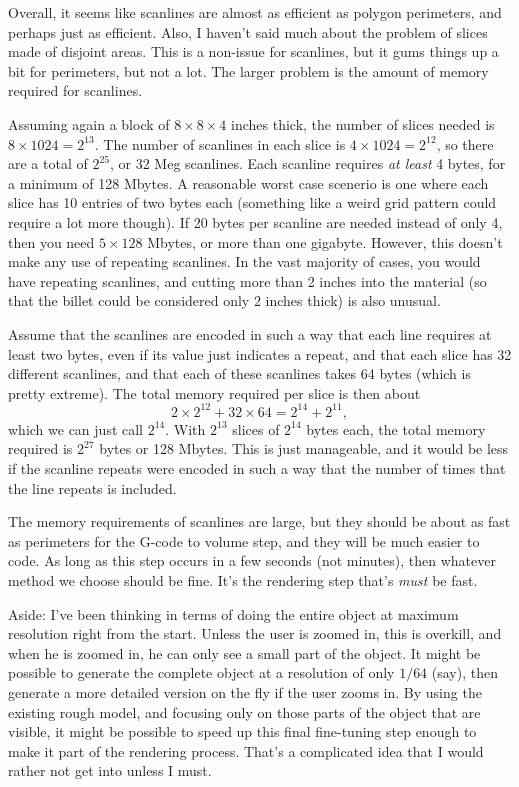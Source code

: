\documentclass[titlepage,oneside,10pt]{article}
\begin{document}
Overall, it seems like scanlines are almost as efficient as polygon
perimeters, and perhaps just as efficient. Also, I haven't said much
about the problem of slices made of disjoint areas. This is a
non-issue for scanlines, but it gums things up a bit for perimeters, but
not a lot. The larger problem is the amount of memory required for
scanlines. 

Assuming again a block of $8\times 8\times 4$ inches thick, the number
of slices needed is $8\times 1024 = 2^{13}$. The number of scanlines
in each slice is $4\times 1024=2^{12}$, so there are a total of
$2^{25}$, or 32 Meg scanlines. Each scanline requires \emph{at least} 4
bytes, for a minimum of 128 Mbytes. A reasonable worst case scenerio
is one where each slice has 10 entries of two bytes each (something
like a weird grid pattern could require a lot more though). If 20 bytes
per scanline are needed instead of only 4, then you need $5\times 128$
Mbytes, or more than one gigabyte. However, this doesn't make any use
of repeating scanlines. In the vast majority of cases, you would have
repeating scanlines, and cutting more than 2 inches into the material
(so that the billet could be considered only 2 inches thick) is also
unusual. 

Assume that the scanlines are encoded in such a way that each line
requires at least two bytes, even if its value just indicates a
repeat, and that each slice has 32 different scanlines, and that each
of these scanlines takes 64 bytes (which is pretty extreme). The total
memory required per slice is then about
$$2\times 2^{12} +32\times 64 = 2^{14}+2^{11},$$
which we can just call $2^{14}$. With $2^{13}$ slices of $2^{14}$ bytes
each, the total memory required is $2^{27}$ bytes or 128 Mbytes. This
is just manageable, and it would be less if the scanline repeats were
encoded in such a way that the number of times that the line repeats
is included.

The memory requirements of scanlines are large, but they should be
about as fast as perimeters for the G-code to volume step, and
they will be much easier to code. As long as this step occurs in a few
seconds (not minutes), then whatever method we choose should be
fine. It's the rendering step that's \emph{must} be fast.

Aside: I've been thinking in terms of doing the entire object at
maximum resolution right from the start. Unless the user is zoomed in,
this is overkill, and when he is zoomed in, he can only see a small
part of the object. It might be possible to generate the complete
object at a resolution of only $1/64$ (say), then generate a more
detailed version on the fly if the user zooms in. By using the
existing rough model, and focusing only on those parts of the object
that are visible, it might be possible to speed up this final
fine-tuning step enough to make it part of the rendering
process. That's a complicated idea that I would rather not get into
unless I must.
\end{document}
